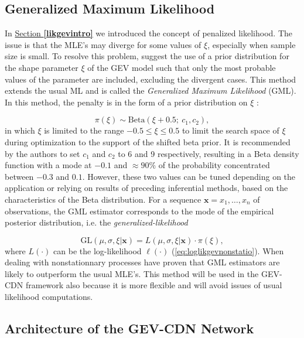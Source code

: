 \subsection{Generalized Maximum Likelihood}


In \hyperref[likgevintro]{Section \textbf{\ref{likgevintro}}} we introduced the concept of penalized likelihood. The issue is that the MLE's may diverge for some values of $\xi$, especially when sample size is small. To resolve this problem, \citet{martins_generalized_2000} suggest the use of a prior distribution for the shape parameter $\xi$ of the GEV model such
that only the most probable values of the parameter are included, excluding the divergent cases. This method extends the usual ML and is called the \emph{Generalized Maximum Likelihood} (GML). In this method, the penalty is in the form of a prior distribution on $\xi$ : 

\begin{equation}\label{eq:betaprior}
\pi(\xi)\sim\text{Beta}(\xi+0.5 ; \ c_1,c_2),
\end{equation}
in which $\xi$ is limited to the range $-0.5\leq\xi\leq 0.5$ to limit the search space of $\xi$ during optimization to the support of the shifted beta prior. It is recommended by the authors to set $c_1$ and $c_2$ to 6 and 9 respectively, resulting in a Beta density function with a mode at $-0.1$ and $\approx 90\%$ of the probability concentrated between $-0.3$ and $0.1$. However, these two values can be tuned depending on the application or relying on results of preceding inferential methods, based on the characteristics of the Beta distribution. For a sequence $\boldsymbol{x}=x_1,\ldots,x_n$ of observations, the GML estimator corresponds to the mode of the empirical posterior distribution, i.e. the \emph{generalized-likelihood}

\begin{equation}\label{eq:gml}
\text{GL}(\mu, \sigma,\xi|\boldsymbol{x})=L(\mu,\sigma,\xi|\boldsymbol{x})\cdot \pi(\xi),
\end{equation}
where $L(\cdot)$ can be the log-likelihood $\ell(\cdot)$ (\ref{eq:loglikgevnonstatio}).
When dealing with nonstationnary processes \cite{el_adlouni_generalized_2007} have proven that GML estimators are likely to outperform the usual MLE's. This method will be used in the GEV-CDN framework also because it is more flexible and will avoid issues of usual likelihood computations.


\subsection{Architecture of the GEV-CDN Network}




